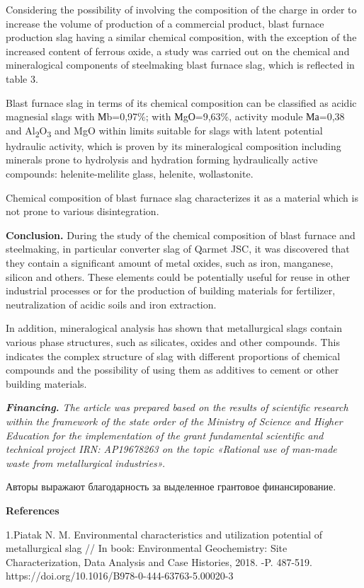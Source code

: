 Considering the possibility of involving the composition of the charge
in order to increase the volume of production of a commercial product,
blast furnace production slag having a similar chemical composition,
with the exception of the increased content of ferrous oxide, a study
was carried out on the chemical and mineralogical components of
steelmaking blast furnace slag, which is reflected in table 3.

Blast furnace slag in terms of its chemical composition can be
classified as acidic magnesial slags with Мb=0,97\%; with МgО=9,63\%,
activity module Ма=0,38 and Al\textsubscript{2}O\textsubscript{3} and
MgO within limits suitable for slags with latent potential hydraulic
activity, which is proven by its mineralogical composition including
minerals prone to hydrolysis and hydration forming hydraulically active
compounds: helenite-melilite glass, helenite, wollastonite.

Chemical composition of blast furnace slag characterizes it as a
material which is not prone to various disintegration.

\textbf{Conclusion.} During the study of the chemical composition of
blast furnace and steelmaking, in particular converter slag of Qarmet
JSC, it was discovered that they contain a significant amount of metal
oxides, such as iron, manganese, silicon and others. These elements
could be potentially useful for reuse in other industrial processes or
for the production of building materials for fertilizer, neutralization
of acidic soils and iron extraction.

In addition, mineralogical analysis has shown that metallurgical slags
contain various phase structures, such as silicates, oxides and other
compounds. This indicates the complex structure of slag with different
proportions of chemical compounds and the possibility of using them as
additives to cement or other building materials.

\emph{\textbf{Financing.} The article was prepared based on the results
of scientific research within the framework of the state order of the
Ministry of Science and Higher Education for the implementation of the
grant fundamental scientific and technical project IRN: AP19678263 on
the topic «Rational use of man-made waste from metallurgical
industries».}

Авторы выражают благодарность за выделенное грантовое финансирование.

\textbf{References}

1.Piatak N. M. Environmental characteristics and utilization potential
of metallurgical slag // In book: Environmental Geochemistry: Site
Characterization, Data Analysis and Case Histories, 2018. -P. 487-519.
https://doi.org/10.1016/B978-0-444-63763-5.00020-3

